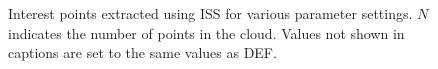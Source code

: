 \documentclass[11pt,a4paper]{kth-mag}
\begin{document}
\begin{figure}
{  }
  \centerline{
  }
  \caption{Interest points extracted using ISS for various parameter settings.
    $N$ indicates the number of points in the cloud. Values not shown in
    captions are set to the same values as DEF.}
  \label{fig:intiss}
\end{figure}
\end{document}
